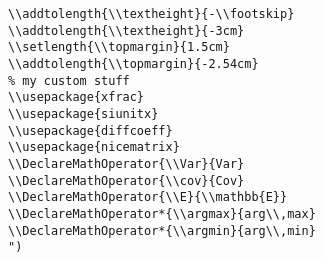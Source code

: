 \documentclass[c]{article}
\DeclareMathOperator{\Var}{Var}
\DeclareMathOperator{\cov}{Cov}
\DeclareMathOperator{\E}{\mathbb{E}}
\DeclareMathOperator*{\argmax}{arg\,max}
\DeclareMathOperator*{\argmin}{arg\,min}
\theoremstyle{plain}%
\theoremstyle{definition}
\theoremstyle{remark}
\begin{document}
\begin{enumerate}
\begin{verbatim}
\\addtolength{\\textheight}{-\\footskip}
\\addtolength{\\textheight}{-3cm}
\\setlength{\\topmargin}{1.5cm}
\\addtolength{\\topmargin}{-2.54cm}
% my custom stuff
\\usepackage{xfrac}
\\usepackage{siunitx}
\\usepackage{diffcoeff}
\\usepackage{nicematrix}
\\DeclareMathOperator{\\Var}{Var}
\\DeclareMathOperator{\\cov}{Cov}
\\DeclareMathOperator{\\E}{\\mathbb{E}}
\\DeclareMathOperator*{\\argmax}{arg\\,max}
\\DeclareMathOperator*{\\argmin}{arg\\,min}
")

\end{verbatim}
\end{enumerate}
\end{document}
